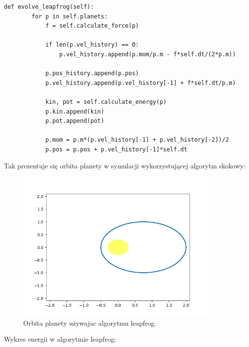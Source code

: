 \documentclass[10pt,a4paper]{article}
\begin{document}
	\begin{lstlisting}
def evolve_leapfrog(self):
        for p in self.planets:
            f = self.calculate_force(p)

            if len(p.vel_history) == 0:
                p.vel_history.append(p.mom/p.m - f*self.dt/(2*p.m))

            p.pos_history.append(p.pos)
            p.vel_history.append(p.vel_history[-1] + f*self.dt/p.m)

            kin, pot = self.calculate_energy(p)
            p.kin.append(kin)
            p.pot.append(pot)
            
            p.mom = p.m*(p.vel_history[-1] + p.vel_history[-2])/2
            p.pos = p.pos + p.vel_history[-1]*self.dt
	\end{lstlisting}	
	
	Tak prezentuje się orbita planety w symulacji wykorzystującej algorytm skokowy:
	
	\begin{figure}[htp!!!!!!!]	
		\begin{center}
			\includegraphics[width = 0.9\textwidth]{leapfrog_orbit.png}
			\caption{Orbita planety używajac algorytmu leapfrog.}
			\label{schemat}
		\end{center}
	\end{figure} 	
	
	Wykres energii w algorytmie leapfrog:
	
\end{document}
